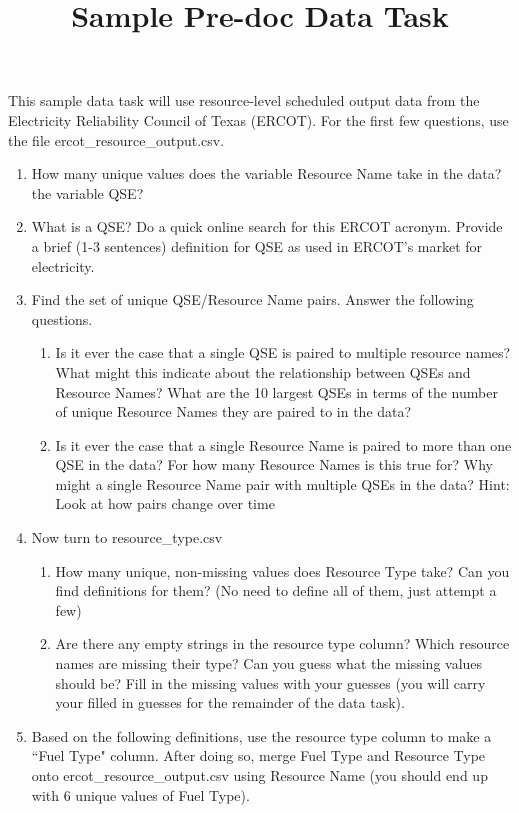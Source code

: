 \documentclass{article}
\begin{document}
\title{Sample Pre-doc Data Task}
\maketitle

This sample data task will use resource-level scheduled output data from the Electricity Reliability Council of Texas (ERCOT). For the first few questions, use the file ercot\_resource\_output.csv.
\begin{enumerate}
\item How many unique values does the variable Resource Name take in the data? the variable QSE?
\item What is a QSE? Do a quick online search for this ERCOT acronym. Provide a brief (1-3 sentences) definition for QSE as used in ERCOT's market for electricity. 
\item Find the set of unique QSE/Resource Name pairs. Answer the following questions.
\begin{enumerate}
\item Is it ever the case that a single QSE is paired to multiple resource names? What might this indicate about the relationship between QSEs and Resource Names? What are the 10 largest QSEs in terms of the number of unique Resource Names they are paired to in the data?
\item Is it ever the case that a single Resource Name is paired to more than one QSE in the data? For how many Resource Names is this true for? Why might a single Resource Name pair with multiple QSEs in the data? Hint: Look at how pairs change over time
\end{enumerate}
\item Now turn to resource\_type.csv
\begin{enumerate}
\item How many unique, non-missing values does Resource Type take? Can you find definitions for them? (No need to define all of them, just attempt a few)
\item Are there any empty strings in the resource type column? Which resource names are missing their type? Can you guess what the missing values should be? Fill in the missing values with your guesses (you will carry your filled in guesses for the remainder of the data task).
\end{enumerate}
\item Based on the following definitions, use the resource type column to make a ``Fuel Type" column. After doing so, merge Fuel Type and Resource Type onto ercot\_resource\_output.csv using Resource Name (you should end up with 6 unique values of Fuel Type). 

\end{enumerate}
\end{document}
